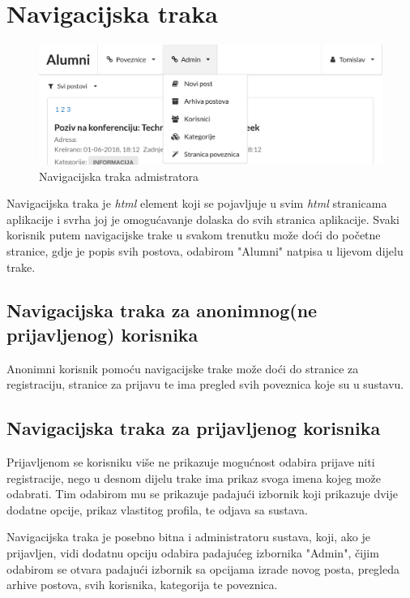 \documentclass[zavrsni, numeric]{fer}
\begin{document}
\section{Navigacijska traka}

\begin{figure}[H]
	\centering
	\includegraphics[width=13cm]{slike/nav-admin.png}
	\caption{Navigacijska traka admistratora}
	\label{fig:nav-admin}
\end{figure}

Navigacijska traka je \textit{html} element koji se pojavljuje u svim \textit{html} stranicama aplikacije i svrha joj je omogućavanje dolaska do svih stranica aplikacije. Svaki korisnik putem navigacijske trake u svakom trenutku može doći do početne stranice, gdje je popis svih postova, odabirom "Alumni" natpisa u lijevom dijelu trake. 

\subsection{Navigacijska traka za anonimnog(ne prijavljenog) korisnika}
Anonimni korisnik pomoću navigacijske trake može doći do stranice za registraciju, stranice za prijavu te ima pregled svih poveznica koje su u sustavu. 

\subsection{Navigacijska traka za prijavljenog korisnika}
Prijavljenom se korisniku više ne prikazuje mogućnost odabira prijave niti registracije, nego u desnom dijelu trake ima prikaz svoga imena kojeg može odabrati. Tim odabirom mu se prikazuje padajući izbornik koji prikazuje dvije dodatne opcije, prikaz vlastitog profila, te odjava sa sustava.

Navigacijska traka je posebno bitna i administratoru sustava, koji, ako je prijavljen, vidi dodatnu opciju odabira padajućeg izbornika "Admin", čijim odabirom se otvara padajući izbornik sa opcijama izrade novog posta, pregleda arhive postova, svih korisnika, kategorija te poveznica.
\end{document}
